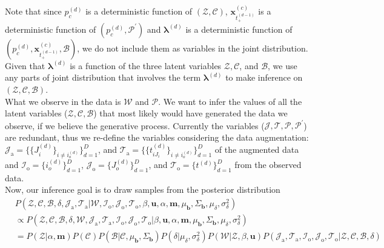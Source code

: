 \documentclass[a4paper]{article}
\begin{document}
	  Note that since $p_c^{(d)}$ is a deterministic function of $(\mathcal{Z}, \mathcal{C})$, $\boldsymbol{x}_{t_+^{(d-1)}}^{(c)}$ is a deterministic function of $(p_c^{(d)}, \mathcal{P}^{\prime})$  and $\boldsymbol{\lambda}^{(d)}$ is a deterministic function of $(p_c^{(d)}, \boldsymbol{x}_{t_+^{(d-1)}}^{(c)}, \mathcal{B})$, we do not include them as variables in the joint distribution. Given that $\boldsymbol{\lambda}^{(d)}$ is a function of the three latent variables $\mathcal{Z}, \mathcal{C}$, and $\mathcal{B}$, we use any parts of joint distribution that involves the term $\boldsymbol{\lambda}^{(d)}$ to make inference on $(\mathcal{Z}, \mathcal{C}, \mathcal{B})$.\\ 
	  
	 What we observe in the data is $\mathcal{W}$ and $\mathcal{P}$. We want to infer the values of all the latent variables ($\mathcal{Z}, \mathcal{C}, \mathcal{B}$) that most likely would have generated the data we observe, if we believe the generative process. Currently the variables ($\mathcal{J}, \mathcal{T}, \mathcal{P}, \mathcal{P^\prime}$) are redundant, thus we re-define the variables considering the data augmentation:   $\mathcal{J}_{\mbox{a}}=\{\{J_i^{(d)}\}_{i\neq i_o^{(d)}}\}_{d=1}^D$, and $\mathcal{T}_{\mbox{a}}=\{\{t_{iJ_i}^{(d)}\}_{i\neq i_o^{(d)}}\}_{d=1}^D$ of the augmented data and $\mathcal{I}_{\mbox{o}}=\{i_o^{(d)}\}_{d=1}^D$,  $\mathcal{J}_{\mbox{o}}=\{J_o^{(d)}\}_{d=1}^D$, and $\mathcal{T}_{\mbox{o}}= \{t^{(d)}\}_{d=1}^D$ from the observed data.\\ \newline
	  Now, our inference goal is to draw samples from the posterior distribution
	  \begin{equation}
	  \begin{aligned}
	  &P(\mathcal{Z}, \mathcal{C}, \mathcal{B}, \delta, \mathcal{J}_{\mbox{a}}, \mathcal{T}_{\mbox{a}}|\mathcal{W}, \mathcal{I}_{\mbox{o}}, \mathcal{J}_{\mbox{o}}, \mathcal{T}_{\mbox{o}}, \beta, \boldsymbol{u}, \alpha, \boldsymbol{m}, \mu_{\boldsymbol{b}}, \Sigma_{\boldsymbol{b}}, \mu_\delta, \sigma^2_\delta) \\
	  &\propto 	P(\mathcal{Z}, \mathcal{C}, \mathcal{B}, \delta, \mathcal{W}, \mathcal{J}_{\mbox{a}}, \mathcal{T}_{\mbox{a}},\mathcal{I}_{\mbox{o}}, \mathcal{J}_{\mbox{o}}, \mathcal{T}_{\mbox{o}} |\beta, \boldsymbol{u}, \alpha, \boldsymbol{m}, \mu_{\boldsymbol{b}}, \Sigma_{\boldsymbol{b}}, \mu_\delta, \sigma^2_\delta)\\&  = P(\mathcal{Z}|\alpha, \boldsymbol{m})P(\mathcal{C})P(\mathcal{B}|\mathcal{C}, \mu_{\boldsymbol{b}}, \Sigma_{\boldsymbol{b}})P(\delta | \mu_\delta, \sigma^2_\delta) P(\mathcal{W}|\mathcal{Z}, \beta, \boldsymbol{u})P(\mathcal{J}_{\mbox{a}}, \mathcal{T}_{\mbox{a}},\mathcal{I}_{\mbox{o}}, \mathcal{J}_{\mbox{o}}, \mathcal{T}_{\mbox{o}} |\mathcal{Z}, \mathcal{C}, \mathcal{B}, \delta)
	  \end{aligned}
	  \end{equation}
\end{document}
